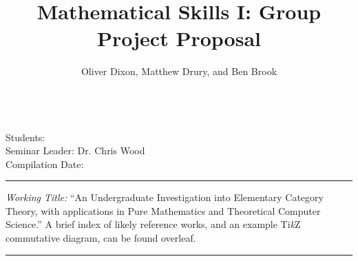 \documentclass{article}
\title{Mathematical Skills I: Group Project Proposal}
\author{Oliver Dixon, Matthew Drury, and Ben Brook}
\newcommand{\semleader}{Dr. Chris Wood}
\begin{document}
%
\thispagestyle{titlepage}
\pagestyle{genpage}
\makeatletter
\noindent\large\textbf{\@title}\\[0.8\baselineskip]
\normalsize Students: \@author\\
Seminar Leader: \semleader\\
Compilation Date: \@date%
\makeatother
%
\vspace{1.5\baselineskip}\hrule\vspace{\baselineskip}
\textit{Working Title:} ``An Undergraduate Investigation into Elementary
Category Theory, with applications in Pure Mathematics and Theoretical Computer
Science.'' A brief index of likely reference works, and an example Ti\textit{k}Z
commutative diagram, can be found overleaf.
\vspace{\baselineskip}\hrule\vspace{\baselineskip}
%
\end{document}
